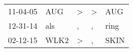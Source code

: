 \begin{supertabular}{p{0.07\textwidth}p{0.06\textwidth}p{0.02\textwidth}p{0.02\textwidth}p{0.06\textwidth}}
 11-04-05\textsuperscript{} &   AUG\textsuperscript{} &  \textgreater &  \textgreater &   AUG\textsuperscript{} \\
 12-31-14\textsuperscript{} &   als\textsuperscript{} &             , &             , &  ring\textsuperscript{} \\
 02-12-15\textsuperscript{} &  WLK2\textsuperscript{} &  \textgreater &             , &  SKIN\textsuperscript{} \\
\end{supertabular}
